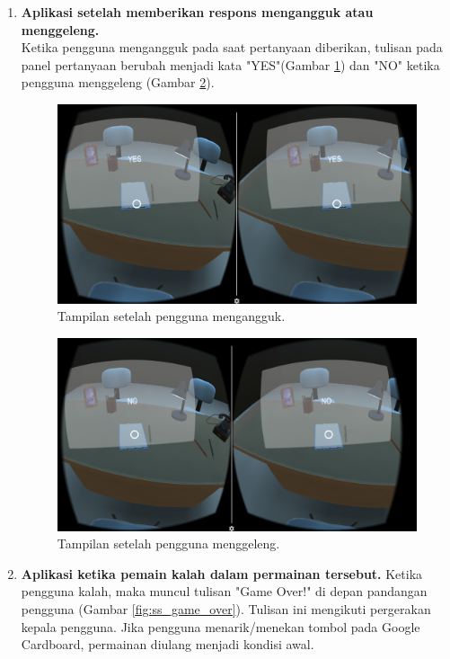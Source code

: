 \begin{enumerate}
    \item \textbf{Aplikasi setelah memberikan respons mengangguk atau menggeleng.}\\
    Ketika pengguna mengangguk pada saat pertanyaan diberikan, tulisan pada panel pertanyaan berubah menjadi kata "YES"(Gambar \ref{fig:ss_pengguna_mengangguk}) dan "NO" ketika pengguna menggeleng (Gambar \ref{fig:ss_pengguna_menggeleng}).
    
    \begin{figure}[htbp]
    \centering
    \includegraphics[scale=0.53]{Gambar/screenshot-aplikasi/pengguna-mengangguk.png}
    \caption{Tampilan setelah pengguna mengangguk.} 
    \label{fig:ss_pengguna_mengangguk}
    \end{figure}
    
    \begin{figure}[htbp]
    \centering
    \includegraphics[scale=0.53]{Gambar/screenshot-aplikasi/pengguna-menggeleng.png}
    \caption{Tampilan setelah pengguna menggeleng.} 
    \label{fig:ss_pengguna_menggeleng}
    \end{figure}
    
    \item \textbf{Aplikasi ketika pemain kalah dalam permainan tersebut.}
    Ketika pengguna kalah, maka muncul tulisan "Game Over!" di depan pandangan pengguna (Gambar \ref{fig:ss_game_over}). Tulisan ini mengikuti pergerakan kepala pengguna. Jika pengguna menarik/menekan tombol pada Google Cardboard, permainan diulang menjadi kondisi awal.
    

\end{enumerate}
